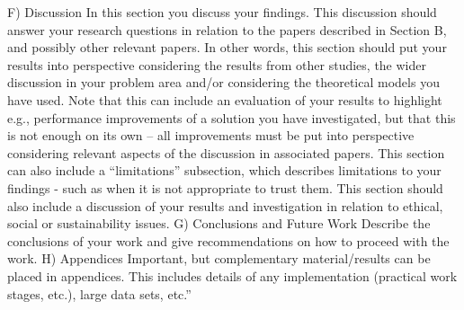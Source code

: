 F) Discussion
In this section you discuss your findings. This discussion should answer your research questions in relation to the papers described in Section B, and possibly other relevant papers. In other words, this section should put your results into perspective considering the results from other studies, the wider discussion in your problem area and/or considering the theoretical models you have used.
Note that this can include an evaluation of your results to highlight e.g., performance improvements of a solution you have investigated, but that this is not enough on its own – all improvements must be put into perspective considering relevant aspects of the discussion in associated papers.
This section can also include a “limitations” subsection, which describes limitations to your findings - such as when it is not appropriate to trust them.
This section should also include a discussion of your results and investigation in relation to ethical, social or sustainability issues.
G) Conclusions and Future Work
Describe the conclusions of your work and give recommendations on how to proceed with the work.
H) Appendices
Important, but complementary material/results can be placed in appendices. This includes details of any implementation (practical work stages, etc.), large data sets, etc.”